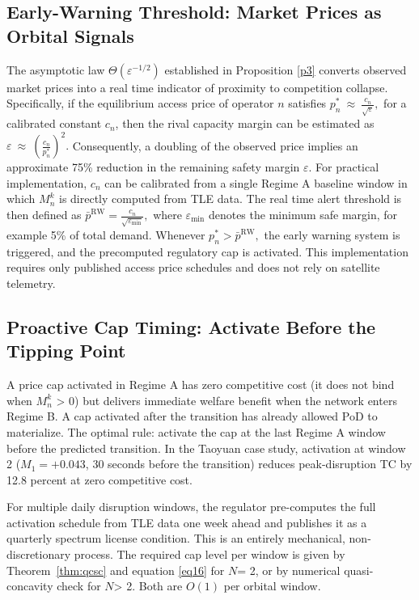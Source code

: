 \documentclass[review,3p,authoryear]{elsarticle}
\begin{document}
\subsection{Early-Warning Threshold: Market Prices as Orbital Signals}
\label{sec8.1}

The asymptotic law ${\Theta} \left({\varepsilon}^{-1/2}\right)$ established in Proposition \ref{p3} converts observed market prices into a real time indicator of proximity to competition collapse. Specifically, if the equilibrium access price of operator $n$ satisfies $p_{n}^{*}~{\approx}~\frac{c_{n}}{\sqrt{{\varepsilon}}},$ for a calibrated constant $c_{n}$, then the rival capacity margin can be estimated as ${\varepsilon}~{\approx}~\left(\frac{c_{n}}{p_{n}^{*}}\right)^{2}.$ Consequently, a doubling of the observed price implies an approximate 75\% reduction in the remaining safety margin ${\varepsilon}$. For practical implementation, $c_{n}$ can be calibrated from a single Regime A baseline window in which $M_{n}^{k}$ is directly computed from TLE data. The real time alert threshold is then defined as $\bar{p}^{\mathrm{RW}}=\frac{c_{n}}{\sqrt{{\varepsilon}_{\min}}},$ where ${\varepsilon}_{\min}$ denotes the minimum safe margin, for example 5\% of total demand. Whenever $p_{n}^{*}>\bar{p}^{\mathrm{RW}},$ the early warning system is triggered, and the precomputed regulatory cap is activated. This implementation requires only published access price schedules and does not rely on satellite telemetry.

\subsection{Proactive Cap Timing: Activate Before the Tipping Point}

A price cap activated in Regime A has zero competitive cost (it does not bind when $M_{n}^{k}$ > 0) but delivers immediate welfare benefit when the network enters Regime B. A cap activated after the transition has already allowed PoD to materialize. The optimal rule: activate the cap at the last Regime A window before the predicted transition. In the Taoyuan case study, activation at window 2 ($M_{1} = +0.043$, 30 seconds before the transition) reduces peak-disruption TC by 12.8 percent at zero competitive cost.

For multiple daily disruption windows, the regulator pre-computes the full activation schedule from TLE data one week ahead and publishes it as a quarterly spectrum license condition. This is an entirely mechanical, non-discretionary process. The required cap level per window is given by Theorem~\ref{thm:qcsc} and equation \eqref{eq16} for $N$= 2, or by numerical quasi-concavity check for $N$> 2. Both are $O\left(1\right)$ per orbital window.
\end{document}
